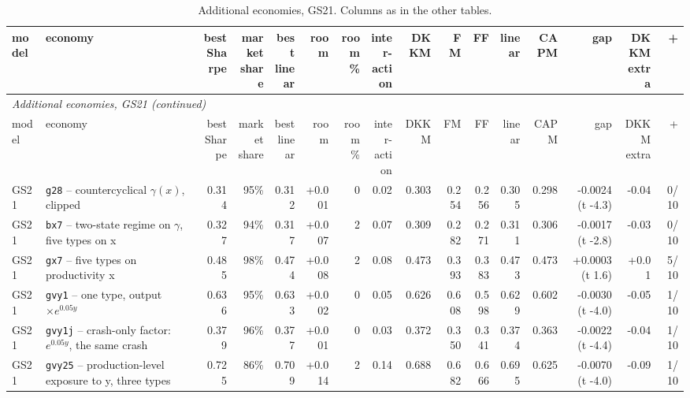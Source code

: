 \begin{landscape}
\begin{longtable}{lp{4.6cm}rrrrrrrrrrrrrr}
\caption{Additional economies, GS21. Columns as in the other tables.}\label{tab:xa-gs21}\\\hline
model & economy & \shortstack[r]{best\\Sharpe} & \shortstack[r]{market\\share} & \shortstack[r]{best\\linear} & room & \shortstack[r]{room\\\%} & \shortstack[r]{inter-\\action} & DKKM & FM & FF & linear & CAPM & gap & \shortstack[r]{DKKM\\extra} & + \\\hline\endfirsthead
\multicolumn{16}{l}{\textit{Additional economies, GS21 (continued)}}\\\hline
model & economy & \shortstack[r]{best\\Sharpe} & \shortstack[r]{market\\share} & \shortstack[r]{best\\linear} & room & \shortstack[r]{room\\\%} & \shortstack[r]{inter-\\action} & DKKM & FM & FF & linear & CAPM & gap & \shortstack[r]{DKKM\\extra} & + \\\hline\endhead
\hline\endfoot
GS21 & \texttt{g28} -- countercyclical $\gamma(x)$, clipped & 0.314 & 95\% & 0.312 & +0.001 & 0 & 0.02 & 0.303 & 0.254 & 0.256 & 0.305 & 0.298 & -0.0024 (t -4.3) & -0.04 & 0/10 \\
GS21 & \texttt{bx7} -- two-state regime on $\gamma$, five types on x & 0.327 & 94\% & 0.317 & +0.007 & 2 & 0.07 & 0.309 & 0.282 & 0.271 & 0.311 & 0.306 & -0.0017 (t -2.8) & -0.03 & 0/10 \\
GS21 & \texttt{gx7} -- five types on productivity x & 0.485 & 98\% & 0.474 & +0.008 & 2 & 0.08 & 0.473 & 0.393 & 0.383 & 0.473 & 0.473 & +0.0003 (t 1.6) & +0.01 & 5/10 \\
GS21 & \texttt{gvy1} -- one type, output $\times e^{0.05y}$ & 0.636 & 95\% & 0.633 & +0.002 & 0 & 0.05 & 0.626 & 0.608 & 0.598 & 0.629 & 0.602 & -0.0030 (t -4.0) & -0.05 & 1/10 \\
GS21 & \texttt{gvy1j} -- crash-only factor: $e^{0.05y}$, the same crash & 0.379 & 96\% & 0.377 & +0.001 & 0 & 0.03 & 0.372 & 0.350 & 0.341 & 0.374 & 0.363 & -0.0022 (t -4.4) & -0.04 & 1/10 \\
GS21 & \texttt{gvy25} -- production-level exposure to y, three types & 0.725 & 86\% & 0.709 & +0.014 & 2 & 0.14 & 0.688 & 0.682 & 0.666 & 0.695 & 0.625 & -0.0070 (t -4.0) & -0.09 & 1/10 \\

\end{longtable}
\end{landscape}
